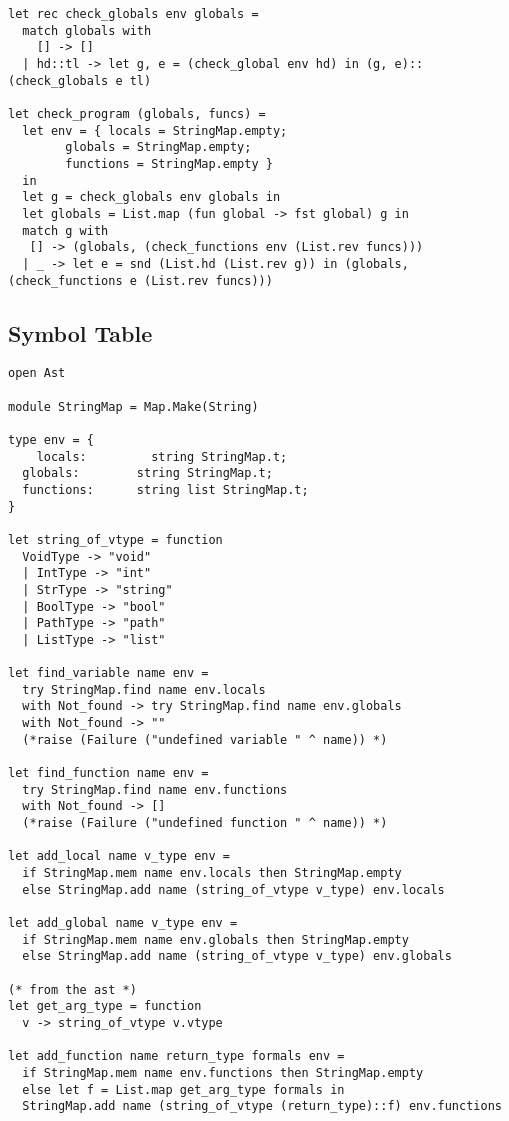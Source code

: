 \documentclass[11pt]{article}
\begin{document}
\begin{listing}[H]
\begin{verbatim}
let rec check_globals env globals =
  match globals with
    [] -> []
  | hd::tl -> let g, e = (check_global env hd) in (g, e)::(check_globals e tl)

let check_program (globals, funcs) =
  let env = { locals = StringMap.empty;
        globals = StringMap.empty;
        functions = StringMap.empty }
  in
  let g = check_globals env globals in
  let globals = List.map (fun global -> fst global) g in
  match g with
   [] -> (globals, (check_functions env (List.rev funcs)))
  | _ -> let e = snd (List.hd (List.rev g)) in (globals, (check_functions e (List.rev funcs)))
  \end{verbatim}
\end{listing}

\newpage

\subsection{Symbol Table}

\begin{listing}[H]
  \begin{verbatim}
open Ast

module StringMap = Map.Make(String)

type env = {
    locals:         string StringMap.t;
  globals:        string StringMap.t;
  functions:      string list StringMap.t;
}

let string_of_vtype = function
  VoidType -> "void"
  | IntType -> "int"
  | StrType -> "string"
  | BoolType -> "bool"
  | PathType -> "path"
  | ListType -> "list"

let find_variable name env =
  try StringMap.find name env.locals
  with Not_found -> try StringMap.find name env.globals
  with Not_found -> ""
  (*raise (Failure ("undefined variable " ^ name)) *)

let find_function name env =
  try StringMap.find name env.functions
  with Not_found -> []
  (*raise (Failure ("undefined function " ^ name)) *)

let add_local name v_type env =
  if StringMap.mem name env.locals then StringMap.empty
  else StringMap.add name (string_of_vtype v_type) env.locals

let add_global name v_type env =
  if StringMap.mem name env.globals then StringMap.empty
  else StringMap.add name (string_of_vtype v_type) env.globals

(* from the ast *)
let get_arg_type = function
  v -> string_of_vtype v.vtype

let add_function name return_type formals env =
  if StringMap.mem name env.functions then StringMap.empty
  else let f = List.map get_arg_type formals in
  StringMap.add name (string_of_vtype (return_type)::f) env.functions

  \end{verbatim}
\end{listing}
\end{document}
